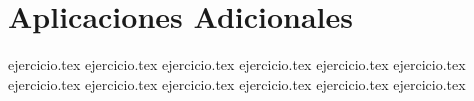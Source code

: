 
\section*{Aplicaciones Adicionales}

\begin{enumerate}
    {ejercicio.tex}
{ejercicio.tex}
{ejercicio.tex}
{ejercicio.tex}
{ejercicio.tex}
{ejercicio.tex}
{ejercicio.tex}
{ejercicio.tex}
{ejercicio.tex}
{ejercicio.tex}
{ejercicio.tex}
{ejercicio.tex}
\end{enumerate}
